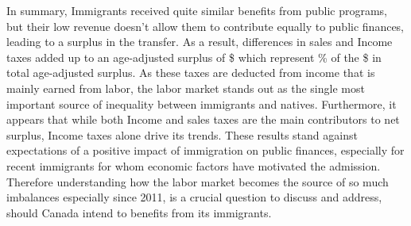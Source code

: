 \vspace{0.7em}\par
In summary, Immigrants received quite similar benefits from public programs, but their low revenue doesn't allow them to contribute equally to public finances, leading to a surplus in the transfer.
As a result, differences in sales and Income taxes added up to an age-adjusted surplus of \$ which  represent \% of the \$ in total age-adjusted surplus.
As these taxes are deducted from income that is mainly earned from labor, the labor market stands out as the single most important source of inequality between immigrants and natives.
Furthermore, it appears that while both Income and sales taxes are the main contributors to net surplus, Income taxes alone drive its trends.
These results stand against expectations of a positive impact of immigration on public finances, especially for recent immigrants for whom economic factors have motivated the admission.
Therefore understanding how the labor market becomes the source of so much imbalances especially since 2011, is a crucial question to discuss and address, should Canada intend to benefits from its immigrants.



















